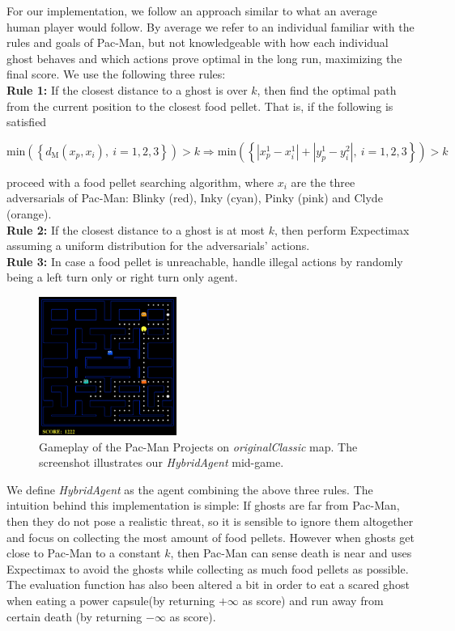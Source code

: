 \documentclass{article}
\begin{document}
	\vspace{10pt}
	For our implementation, we follow an approach similar to what an average human player would follow. By average we refer to an individual familiar with the rules and goals of Pac-Man, but not knowledgeable with how each individual ghost behaves and which actions prove optimal in the long run, maximizing the final score. We use the following three rules: \\
	
	\textbf{Rule 1:} If the closest distance to a ghost is over $k$, then find the optimal path from the current position to the closest food pellet. That is, if the following is satisfied
	
	$$ \text{min} \left( \left\{ d_{\text{M}} (x_p, x_i), ~i=1,2,3 \right\} \right) > k \Rightarrow \text{min} \left( \left\{ | x^1_p - x^1_i | + | y^1_p - y^2_i|, ~i=1,2,3 \right\} \right) > k$$
	
	proceed with a food pellet searching algorithm, where $x_i$ are the three adversarials of Pac-Man: Blinky (red), Inky (cyan), Pinky (pink) and Clyde (orange). \\
	
	\textbf{Rule 2:} If the closest distance to a ghost is at most $k$, then perform Expectimax assuming a uniform distribution for the adversarials' actions. \\
	
	\textbf{Rule 3:} In case a food pellet is unreachable, handle illegal actions by randomly being a left turn only or right turn only agent. \\
	\begin{figure}[h]
		\centering
		\includegraphics[width=0.4\textwidth]{images/gameplay.png}
		\caption{Gameplay of the Pac-Man Projects on \textit{originalClassic} map. The screenshot illustrates our \textit{HybridAgent} mid-game.}
		
	\end{figure}

	We define \textit{HybridAgent} as the agent combining the above three rules. The intuition behind this implementation is simple: If ghosts are far from Pac-Man, then they do not pose a realistic threat, so it is sensible to ignore them altogether and focus on collecting the most amount of food pellets. However when ghosts get close to Pac-Man to a constant $k$, then Pac-Man can sense death is near and uses Expectimax to avoid the ghosts while collecting as much food pellets as possible. The evaluation function has also been altered a bit in order to eat a scared ghost when eating a power capsule(by returning $+\infty$ as score) and run away from certain death (by returning $-\infty$ as score). \\
	
\end{document}
